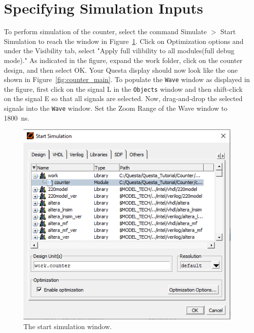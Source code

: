\documentclass[11pt, twoside, pdftex]{article}
\begin{document}
\section{Specifying Simulation Inputs}

To perform simulation of the counter, select the command {\sf Simulate $>$ Start Simulation} to reach
the window in Figure~\ref{fig:counter_start_sim}. Click on Optimization options and under the Visibility tab, select "Apply full vilibility to all modules(full debug mode)." As indicated in the figure, expand the {\sf work} 
folder, click on the {\sf counter} design, and then select {\sf OK}. Your Questa display should
now look like the one shown in Figure~\ref{fig:counter_main}. To populate the 
\texttt{Wave} window as displayed in the figure, first click on the signal {\sf L} in the 
\texttt{Objects} window and then shift-click on the signal {\sf E} so that all signals are selected.
Now, drag-and-drop the selected signals into the \texttt{Wave} window. Set the {\sf Zoom Range} of the Wave
window to 1800~ns.

\begin{figure}[H]
   \begin{center}
      \includegraphics[scale=0.70]{figures/counter_start_sim.png}
   \caption{The start simulation window.} 
	 \label{fig:counter_start_sim}
	 \end{center}
\end{figure}
\end{document}
